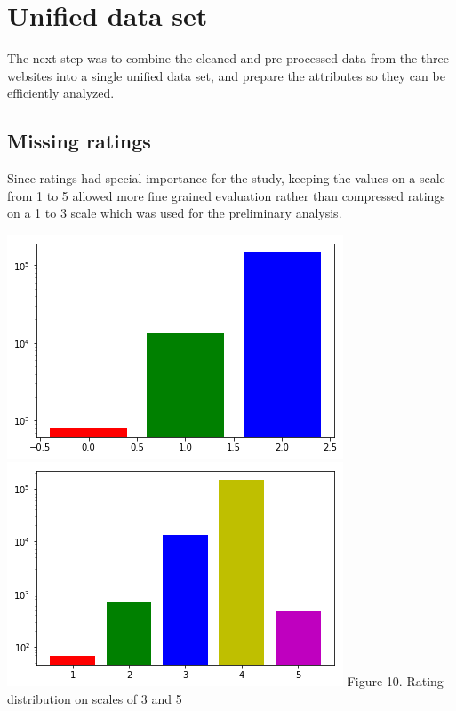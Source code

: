 \documentclass[11pt]{article}
\begin{document}
\section{Unified data set}

The next step was to combine the cleaned and pre-processed data from the three websites into a single unified data set, and prepare the attributes so they can be efficiently analyzed.

\subsection{Missing ratings}

Since ratings had special importance for the study, keeping the values on a scale from 1 to 5 allowed more fine grained evaluation rather than compressed ratings on a 1 to 3 scale which was used for the preliminary analysis.

\vspace{5mm}
\begin{center}
\includegraphics[scale=0.25]{rating-1-to-3}
\includegraphics[scale=0.25]{rating-1-to-5}
\label{rating-dist} Figure 10. Rating distribution on scales of 3 and 5
\end{center}
\vspace{5mm}
\end{document}
